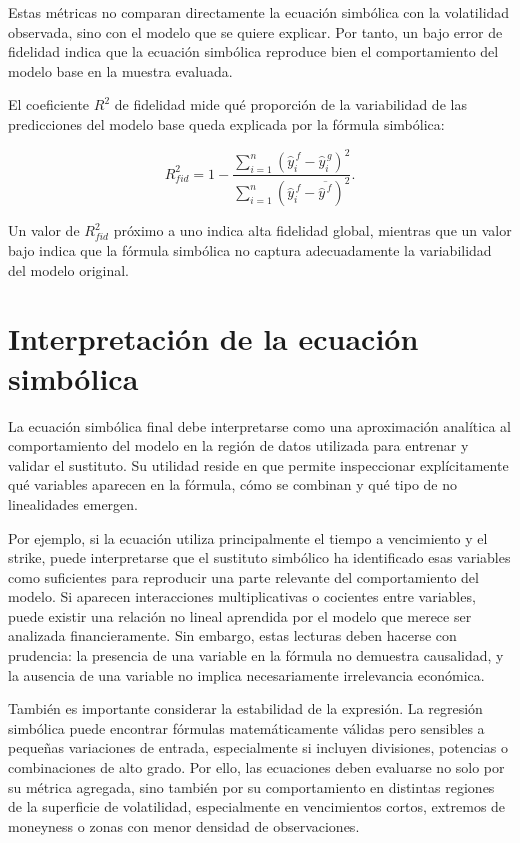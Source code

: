 Estas métricas no comparan directamente la ecuación simbólica con la volatilidad observada, sino con el modelo que se quiere explicar. Por tanto, un bajo error de fidelidad indica que la ecuación simbólica reproduce bien el comportamiento del modelo base en la muestra evaluada.

El coeficiente \(R^2\) de fidelidad mide qué proporción de la variabilidad de las predicciones del modelo base queda explicada por la fórmula simbólica:

\begin{equation}
R^2_{fid}
=
1
-
\frac{
\sum_{i=1}^{n}
\left(
\hat{y}^{\,f}_i
-
\hat{y}^{\,g}_i
\right)^2
}{
\sum_{i=1}^{n}
\left(
\hat{y}^{\,f}_i
-
\overline{\hat{y}^{\,f}}
\right)^2
}.
\label{eq:symbolic-r2-fidelity}
\end{equation}

Un valor de \(R^2_{fid}\) próximo a uno indica alta fidelidad global, mientras que un valor bajo indica que la fórmula simbólica no captura adecuadamente la variabilidad del modelo original.

\section{Interpretación de la ecuación simbólica}

La ecuación simbólica final debe interpretarse como una aproximación analítica al comportamiento del modelo en la región de datos utilizada para entrenar y validar el sustituto. Su utilidad reside en que permite inspeccionar explícitamente qué variables aparecen en la fórmula, cómo se combinan y qué tipo de no linealidades emergen.

Por ejemplo, si la ecuación utiliza principalmente el tiempo a vencimiento y el strike, puede interpretarse que el sustituto simbólico ha identificado esas variables como suficientes para reproducir una parte relevante del comportamiento del modelo. Si aparecen interacciones multiplicativas o cocientes entre variables, puede existir una relación no lineal aprendida por el modelo que merece ser analizada financieramente. Sin embargo, estas lecturas deben hacerse con prudencia: la presencia de una variable en la fórmula no demuestra causalidad, y la ausencia de una variable no implica necesariamente irrelevancia económica.

También es importante considerar la estabilidad de la expresión. La regresión simbólica puede encontrar fórmulas matemáticamente válidas pero sensibles a pequeñas variaciones de entrada, especialmente si incluyen divisiones, potencias o combinaciones de alto grado. Por ello, las ecuaciones deben evaluarse no solo por su métrica agregada, sino también por su comportamiento en distintas regiones de la superficie de volatilidad, especialmente en vencimientos cortos, extremos de moneyness o zonas con menor densidad de observaciones.

